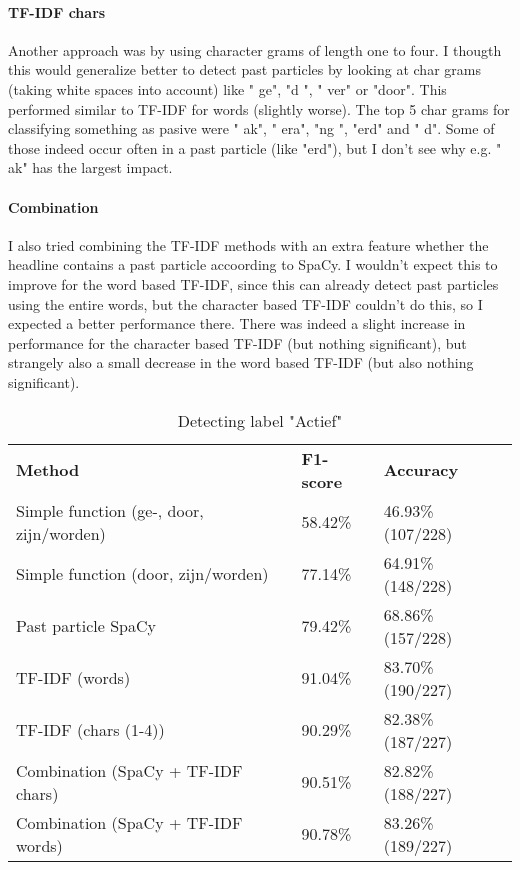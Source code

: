 \documentclass{article}
\begin{document}
\paragraph{TF-IDF chars} Another approach was by using character grams of length one to four. I thougth this would generalize better to detect past particles by looking at char grams (taking white spaces into account) like " ge", "d ", " ver" or "door". This performed similar to TF-IDF for words (slightly worse). The top 5 char grams for classifying something as pasive were " ak", " era", "ng ", "erd" and "  d". Some of those indeed occur often in a past particle (like "erd"), but I don't see why e.g. " ak" has the largest impact.

\paragraph{Combination} I also tried combining the TF-IDF methods with an extra feature whether the headline contains a past particle accoording to SpaCy. I wouldn't expect this to improve for the word based TF-IDF, since this can already detect past particles using the entire words, but the character based TF-IDF couldn't do this, so I expected a better performance there. There was indeed a slight increase in performance for the character based TF-IDF (but nothing significant), but strangely also a small decrease in the word based TF-IDF (but also nothing significant).


\begin{table}[]
\begin{tabular}{lll}
\textbf{Method}                          & \textbf{F1-score} & \textbf{Accuracy} \\
Simple function (ge-, door, zijn/worden) & 58.42\%           & 46.93\% (107/228) \\
Simple function (door, zijn/worden)      & 77.14\%           & 64.91\% (148/228) \\
Past particle SpaCy                      & 79.42\%           & 68.86\% (157/228) \\
TF-IDF (words)                           & 91.04\%           & 83.70\% (190/227) \\
TF-IDF (chars (1-4))                     & 90.29\%           & 82.38\% (187/227) \\
Combination (SpaCy + TF-IDF chars)       & 90.51\%           & 82.82\% (188/227) \\
Combination (SpaCy + TF-IDF words)       & 90.78\%           & 83.26\% (189/227)
\end{tabular}
\caption{Detecting label "Actief"}
\label{tab:activity}
\end{table}
\end{document}
